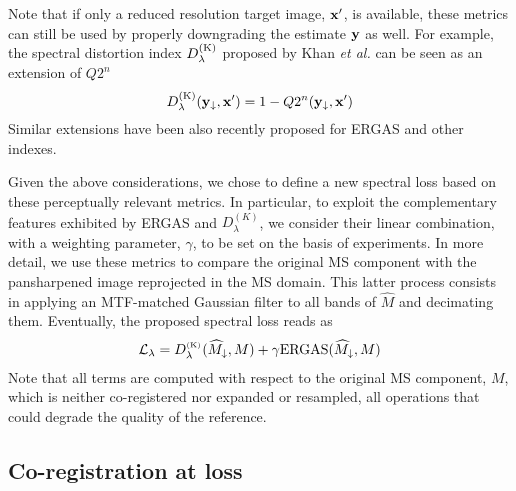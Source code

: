 \documentclass[journal]{IEEEtran}
\newcommand{\hM} {\widehat{M}}
\newcommand{\LL}{{\cal L}}
\newcommand{\DL} {D^{_{\rm (K)}}_\lambda}
\begin{document}
Note that if only a reduced resolution target image, ${\bf x}'$, is available,
these metrics can still be used by properly downgrading the estimate ${\bf y}$ as well.
For example, the spectral distortion index $D^{\rm (K)}_\lambda$ proposed by Khan {\em et al.} \cite{Khan2009}
can be seen as an extension of $Q2^n$
\begin{equation}
    D^{\rm (K)}_\lambda ({\bf y}_\downarrow,{\bf x}') = 1 - Q2^n({\bf y}_\downarrow, {\bf x}')
\end{equation}
Similar extensions have been also recently proposed \cite{Scarpa2022a} for ERGAS and other indexes.

Given the above considerations, we chose to define a new spectral loss based on these perceptually relevant metrics.
In particular, to exploit the complementary features exhibited by ERGAS and $D_\lambda^{(K)}$, we consider
their linear combination, with a weighting parameter, $\gamma$, to be set on the basis of experiments.
In more detail, we use these metrics to compare the original MS component with the pansharpened image reprojected in the MS domain.
This latter process consists in applying an MTF-matched Gaussian filter to all bands of $\hM$ and decimating them.
Eventually, the proposed spectral loss reads as
\begin{eqnarray}
    \LL_\lambda = {\DL}(\hM_\downarrow, M) + \gamma {\rm ERGAS}(\hM_\downarrow, M)
    \label{eq:ll}
\end{eqnarray}
Note that all terms are computed with respect to the original MS component, $M$,
which is neither co-registered nor expanded or resampled, all operations that could degrade the quality of the reference.


\subsection{Co-registration at loss}
\end{document}
